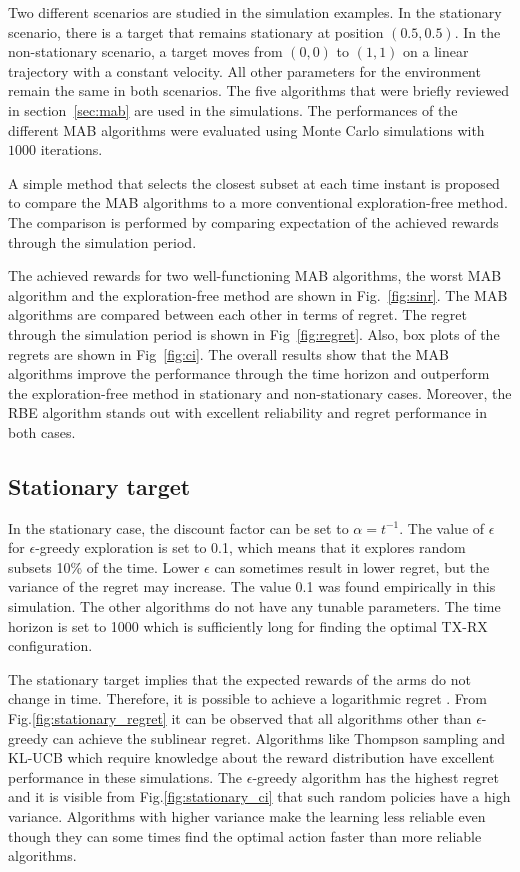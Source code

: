 \documentclass[conference]{IEEEtran}
\begin{document}
Two different scenarios are studied in the simulation examples. 
In the stationary scenario, there is a target that remains stationary at position $(0.5, 0.5)$.
In the non-stationary scenario, a target moves from $(0, 0)$ to $(1, 1)$ on a linear trajectory with a constant velocity.
All other parameters for the environment remain the same in both scenarios.
The five algorithms that were briefly reviewed in section~\ref{sec:mab} are used in the simulations.
The performances of the different MAB algorithms were evaluated using Monte Carlo simulations with $1000$ iterations.

A simple method that selects the closest subset at each time instant is proposed to compare the MAB algorithms to a more conventional exploration-free method. 
The comparison is performed by comparing expectation of the achieved rewards through the simulation period. 

The achieved rewards for two well-functioning MAB algorithms, 
the worst MAB algorithm and the exploration-free method are shown in Fig.~\ref{fig:sinr}. 
The MAB algorithms are compared between each other in terms of regret. 
The regret through the simulation period is shown in Fig~\ref{fig:regret}. 
Also, box plots of the regrets are shown in Fig~\ref{fig:ci}.
The overall results show that the MAB algorithms improve the performance through the time horizon and outperform the exploration-free method in stationary and non-stationary cases.
Moreover, the RBE algorithm stands out with excellent reliability and regret performance in both cases.

\subsection{Stationary target}

In the stationary case, the discount factor can be set to $\alpha=t^{-1}$.
The value of $\epsilon$ for $\epsilon$-greedy exploration is set to 0.1, which means that it explores random subsets 10\% of the time.
Lower $\epsilon$ can sometimes result in lower regret, but the variance of the regret may increase.
The value 0.1 was found empirically in this simulation.
The other algorithms do not have any tunable parameters.
The time horizon is set to 1000 which is sufficiently long for finding the optimal TX-RX configuration.

The stationary target implies that the expected rewards of the arms do not change in time.
Therefore, it is possible to achieve a logarithmic regret \cite{Lattimore2019}.
From Fig.\ref{fig:stationary_regret} it can be observed that all algorithms other than $\epsilon$-greedy can achieve the sublinear regret.
Algorithms like Thompson sampling and KL-UCB which require knowledge about the reward distribution have excellent performance in these simulations.
The $\epsilon$-greedy algorithm has the highest regret and it is visible from Fig.\ref{fig:stationary_ci} that such random policies have a high variance.
Algorithms with higher variance make the learning less reliable even though they can some times find the optimal action faster than more reliable algorithms.
\end{document}
